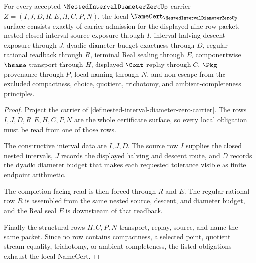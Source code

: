 \begin{theorem}
\label{thm:nested-interval-diameter-zero-obligations}
For every accepted $\NestedIntervalDiameterZeroUp$ carrier $Z=(I,J,D,R,E,H,C,P,N)$, the local $\NameCert_{\NestedIntervalDiameterZeroUp}$ surface consists exactly of carrier admission for the displayed nine-row packet, nested closed interval source exposure through $I$, interval-halving descent exposure through $J$, dyadic diameter-budget exactness through $D$, regular rational readback through $R$, terminal Real sealing through $E$, componentwise $\hsame$ transport through $H$, displayed $\Cont$ replay through $C$, $\Pkg$ provenance through $P$, local naming through $N$, and non-escape from the excluded compactness, choice, quotient, trichotomy, and ambient-completeness principles.
\end{theorem}
\begin{proof}
Project the carrier of \autoref{def:nested-interval-diameter-zero-carrier}. The rows $I,J,D,R,E,H,C,P,N$ are the whole certificate surface, so every local obligation must be read from one of those rows.

The constructive interval data are $I,J,D$. The source row $I$ supplies the closed nested intervals, $J$ records the displayed halving and descent route, and $D$ records the dyadic diameter budget that makes each requested tolerance visible as finite endpoint arithmetic.

The completion-facing read is then forced through $R$ and $E$. The regular rational row $R$ is assembled from the same nested source, descent, and diameter budget, and the Real seal $E$ is downstream of that readback.

Finally the structural rows $H,C,P,N$ transport, replay, source, and name the same packet. Since no row contains compactness, a selected point, quotient stream equality, trichotomy, or ambient completeness, the listed obligations exhaust the local NameCert.
\end{proof}

